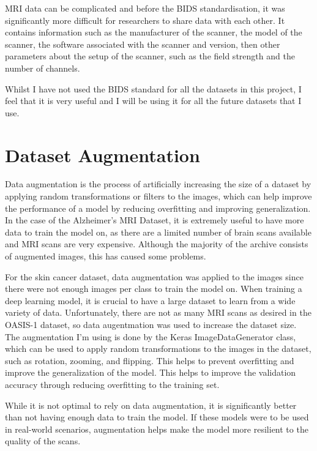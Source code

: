 \documentclass[]{final_report}
\begin{document}
MRI data can be complicated and before the BIDS standardisation, it was significantly more difficult for researchers to share data with each other. It contains information such as the manufacturer of the scanner, the model of the scanner, the software associated with the scanner and version, then other parameters about the setup of the scanner, such as the field strength and the number of channels.\cite{BIDS_metadata}

Whilst I have not used the BIDS standard for all the datasets in this project, I feel that it is very useful and I will be using it for all the future datasets that I use.

\section{Dataset Augmentation}

Data augmentation is the process of artificially increasing the size of a dataset by applying random transformations or filters to the images, which can help improve the performance of a model by reducing overfitting and improving generalization. In the case of the Alzheimer's MRI Dataset, it is extremely useful to have more data to train the model on, as there are a limited number of brain scans available and MRI scans are very expensive. Although the majority of the archive consists of augmented images, this has caused some problems.

For the skin cancer dataset\cite{TAN2019105725}, data augmentation was applied to the images since there were not enough images per class to train the model on. When training a deep learning model, it is crucial to have a large dataset to learn from a wide variety of data. Unfortunately, there are not as many MRI scans as desired in the OASIS-1\cite{OASIS} dataset, so data augentmation was used to increase the dataset size. The augmentation I'm using is done by the Keras\cite{Keras} ImageDataGenerator class, which can be used to apply random transformations to the images in the dataset, such as rotation, zooming, and flipping. This helps to prevent overfitting and improve the generalization of the model. This helps to improve the validation accuracy through reducing overfitting to the training set.

While it is not optimal to rely on data augmentation, it is significantly better than not having enough data to train the model. If these models were to be used in real-world scenarios, augmentation helps make the model more resilient to the quality of the scans.
\end{document}

